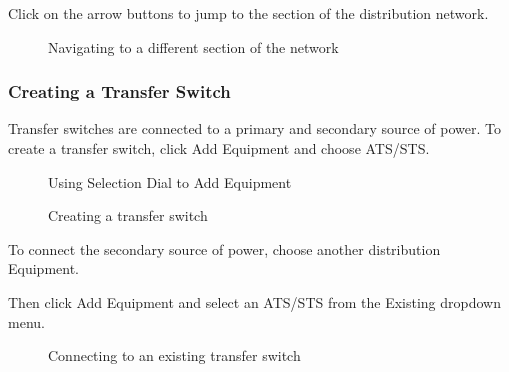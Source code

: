 \documentclass[letterpaper,10pt,english]{sphinxmanual}
\begin{document}
Click on the arrow buttons to jump to the section of the distribution network.

\begin{figure}[H]
\centering
\capstart

\noindent{}
\caption{Navigating to a different section of the network}\label{\detokenize{docs/userguide/buildingelectricalmodel/one-line/index-one-line:id27}}\end{figure}


\subsubsection{Creating a Transfer Switch}
\label{\detokenize{docs/userguide/buildingelectricalmodel/one-line/index-one-line:creating-a-transfer-switch}}\label{\detokenize{docs/userguide/buildingelectricalmodel/one-line/index-one-line:one-line-transfer-switch}}
Transfer switches are connected to a primary and secondary source of power.  To create a transfer switch, click Add Equipment and choose ATS/STS.

\begin{figure}[H]
\centering
\capstart

\noindent{}
\caption{Using Selection Dial to Add Equipment}\label{\detokenize{docs/userguide/buildingelectricalmodel/one-line/index-one-line:id28}}\end{figure}

\begin{figure}[H]
\centering
\capstart

\noindent{}
\caption{Creating a transfer switch}\label{\detokenize{docs/userguide/buildingelectricalmodel/one-line/index-one-line:id29}}\end{figure}

To connect the secondary source of power, choose another distribution Equipment.

Then click Add Equipment and select an ATS/STS from the Existing dropdown menu.

\begin{figure}[H]
\centering
\capstart

\noindent{}
\caption{Connecting to an existing transfer switch}\label{\detokenize{docs/userguide/buildingelectricalmodel/one-line/index-one-line:id30}}\end{figure}
\end{document}
